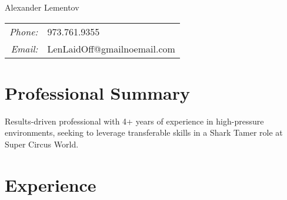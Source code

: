 \documentclass[11pt]{article}
\begin{document}
\pagestyle{empty}

\begin{center}
\Large Alexander Lementov
\end{center}

\begin{tabular}{rl}
\textit{Phone:} & 973.761.9355 \\
\textit{Email:} & LenLaidOff@gmailnoemail.com
\end{tabular}

\vspace{12pt}

\section{Professional Summary}

Results-driven professional with 4+ years of experience in high-pressure environments, seeking to leverage transferable skills in a Shark Tamer role at Super Circus World.

\vspace{12pt}

\section{Experience}
\end{document}
